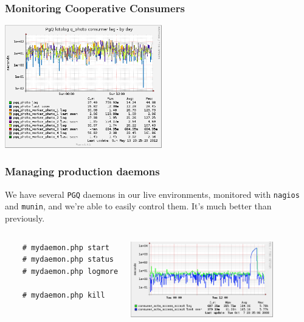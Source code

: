 \documentclass{beamer}
\begin{document}
\begin{frame}[fragile]
  \frametitle{Monitoring Cooperative Consumers}

\begin{center} 
\includegraphics[height=2.1in]{pg_queue_fotolog_q_photo-day.png}
\end{center} 
\end{frame}

\begin{frame}[fragile]
  \frametitle{Managing production daemons}

  We have several \texttt{PGQ} daemons in our live environments, monitored
  with \texttt{nagios} and \texttt{munin}, and we're able to easily control
  them. It's much better than previously.

\begin{columns}[c]
  \begin{example}
  \begin{verbatim}
    # mydaemon.php start
    # mydaemon.php status
    # mydaemon.php logmore

    # mydaemon.php kill
  \end{verbatim}
  \end{example}
\begin{center} 
\includegraphics[height=1.3in]{pgq.png}
\end{center} 
\end{columns}
\end{frame}
\end{document}
